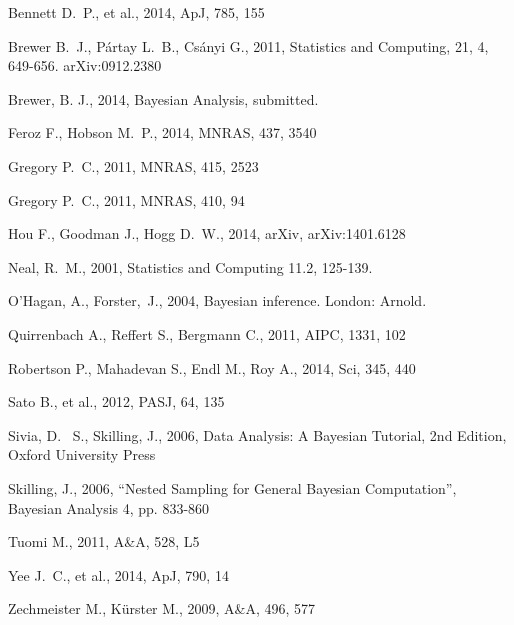 \documentclass[useAMS,usenatbib]{mn2e}
\begin{document}
\begin{thebibliography}{99}

 Bennett D.~P., et al., 2014, ApJ, 785, 155 

 Brewer B.~J., P{\'a}rtay L.~B., Cs{\'a}nyi G., 2011,
Statistics and Computing, 21, 4, 649-656. arXiv:0912.2380

 Brewer, B. J., 2014,
Bayesian Analysis, submitted.

 Feroz F., Hobson M.~P., 2014, MNRAS, 437, 3540 

Gregory P.~C., 2011, MNRAS, 415, 2523 

Gregory P.~C., 2011, MNRAS, 410, 94 

 Hou F., Goodman J., Hogg D.~W., 2014, arXiv, arXiv:1401.6128 

Neal, R.~M., 2001, Statistics and Computing 11.2, 125-139.

O'Hagan, A., Forster,~J., 2004, Bayesian inference. London: Arnold.

 Quirrenbach A., Reffert S., Bergmann C., 2011, AIPC, 1331, 102 

 Robertson P., Mahadevan S., Endl M., Roy 
A., 2014, Sci, 345, 440 

Sato B., et al., 2012, PASJ, 64, 135 

 Sivia, 
D.~ S., Skilling, J., 2006, Data Analysis: A Bayesian Tutorial, 2nd 
Edition, Oxford University Press

 Skilling, 
J., 2006, ``Nested Sampling for General Bayesian Computation'', Bayesian 
Analysis 4, pp. 833-860

 Tuomi M., 2011, A\&A, 528, L5 

Yee J.~C., et al., 2014, ApJ, 790, 14 

 Zechmeister M., K{\"u}rster M., 2009, A\&A, 496, 577  

\end{thebibliography}
\end{document}
